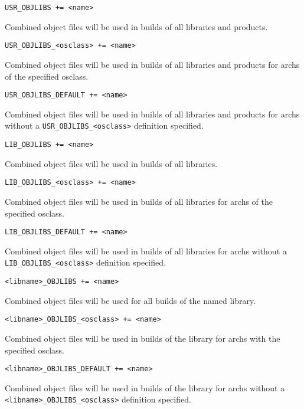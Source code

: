 \begin{description}

\item {}\verb|USR_OBJLIBS += <name>|

Combined object files will be used in builds of all libraries and products.

\item \verb|USR_OBJLIBS_<osclass> += <name>|

Combined object files will be used in builds of all libraries and products for archs of the specified osclass.

\item \verb|USR_OBJLIBS_DEFAULT += <name>|

Combined object files will be used in builds of all libraries and products for archs without a \verb|USR_OBJLIBS_<osclass>| definition specified.

\item

\item {}\verb|LIB_OBJLIBS += <name>|

Combined object files will be used in builds of all libraries.

\item \verb|LIB_OBJLIBS_<osclass> += <name>|

Combined object files will be used in builds of all libraries for archs of the specified osclass.

\item \verb|LIB_OBJLIBS_DEFAULT += <name>|

Combined object files will be used in builds of all libraries for archs without a \verb|LIB_OBJLIBS_<osclass>|
definition specified.

\item

\item {}\verb|<libname>_OBJLIBS += <name>|

Combined object files will be used for all builds of the named library.

\item \verb|<libname>_OBJLIBS_<osclass> += <name>| 

Combined object files will be used in builds of the library for archs with the specified osclass.

\item \verb|<libname>_OBJLIBS_DEFAULT += <name>|

Combined object files will be used in builds of the library for archs without a 
\verb|<libname>_OBJLIBS_<osclass>|
definition specified.


\end{description}

